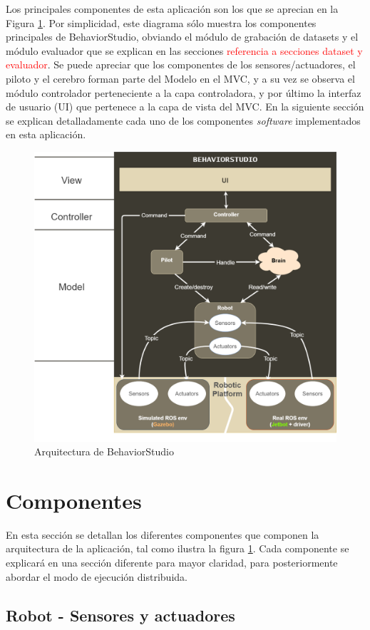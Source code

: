 Los principales componentes de esta aplicación son los que se aprecian en la Figura \ref{fig:architecture}. Por simplicidad, este diagrama sólo muestra los componentes principales de BehaviorStudio, obviando el módulo de grabación de datasets y el módulo evaluador que se explican en las secciones \textcolor{red}{referencia a secciones dataset y evaluador}. Se puede apreciar que los componentes de los sensores/actuadores, el piloto y el cerebro forman parte del Modelo en el MVC, y a su vez se observa el módulo controlador perteneciente a la capa controladora, y por último la interfaz de usuario (UI) que pertenece a la capa de vista del MVC. En la siguiente sección se explican detalladamente cada uno de los componentes \textit{software} implementados en esta aplicación.

\begin{figure}
  \centering
  \includegraphics[width=.7\linewidth]{img/arquitectura}
  \caption{Arquitectura de BehaviorStudio}
  \label{fig:architecture}
\end{figure}

\section{Componentes}
\label{sec:components}

En esta sección se detallan los diferentes componentes que componen la arquitectura de la aplicación, tal como ilustra la figura \ref{fig:architecture}. Cada componente se explicará en una sección diferente para mayor claridad, para posteriormente abordar el modo de ejecución distribuida.

\subsection{Robot - Sensores y actuadores}

